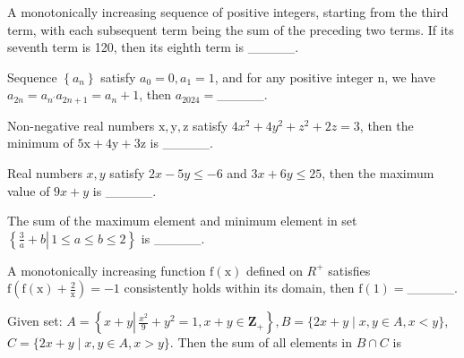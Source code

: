 \begin{problem}\label{AI-Algebra30}
A monotonically increasing sequence of positive integers, starting from the third term, with each subsequent term being the sum of the preceding two terms. If its seventh term is 120, then its eighth term is \_\_\_\_\_.
\end{problem}

\begin{problem}\label{AI-Algebra31}
Sequence $\left\{a_{n}\right\}$ satisfy $a_{0}=0, a_{1}=1$, and for any positive integer $\mathrm{n}$, we have$a_{2 n}=a_{n^{\prime}} a_{2 n+1}=a_{n}+1$, then $a_{2024}=$\_\_\_\_\_.
\end{problem}


\begin{problem}\label{AI-Algebra32}
Non-negative real numbers $\mathrm{x}, \mathrm{y}, \mathrm{z}$ satisfy $4 x^{2}+4 y^{2}+z^{2}+2 z=3$, then the minimum of $5 \mathrm{x}+4 \mathrm{y}+3 \mathrm{z}$ is \_\_\_\_\_.
\end{problem}



\begin{problem}\label{AI-Algebra33}
Real numbers $x, y$ satisfy $2 x-5 y \leq-6$ and $3 x+6 y \leq 25$, then the maximum value of $9 x+y$ is \_\_\_\_\_.
\end{problem}


\begin{problem}\label{AI-Algebra34}
The sum of the maximum element and minimum element in set \\
$\left\{\left.\frac{3}{a}+b \right\rvert\, 1 \leq a \leq b \leq 2\right\}$ is \_\_\_\_\_.
\end{problem}



\begin{problem}\label{AI-Algebra35}
A monotonically increasing function $\mathrm{f}(\mathrm{x})$ defined on $R^{+}$ satisfies  $\mathrm{f}\left(\mathrm{f}(\mathrm{x})+\frac{2}{\mathrm{x}}\right)=-1$ consistently holds within its domain, then $\mathrm{f}(1)=$\_\_\_\_\_.
\end{problem}


\begin{problem}\label{AI-Algebra37}
Given set: $A=\left\{x+y \left\lvert\, \frac{x^{2}}{9}+y^{2}=1\right., x+y \in \mathbf{Z}_{+}\right\}, B=\{2 x+y \mid x, y \in A, x<y\}$, $C=\{2 x+y \mid x, y \in A, x>y\}$. Then the sum of all elements in $B \cap C$ is
\end{problem}


